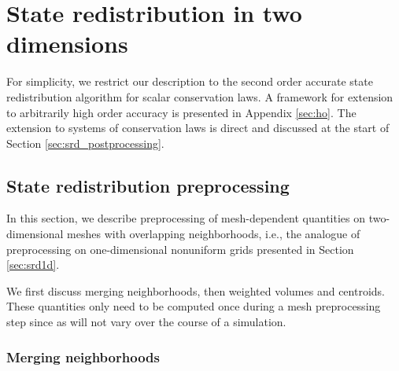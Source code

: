\section{State redistribution in two dimensions}\label{sec:srdAlg}

For simplicity, we restrict our description to the second order accurate state redistribution algorithm for scalar conservation laws.  A framework for extension to arbitrarily high order accuracy is presented in Appendix \ref{sec:ho}.  The extension to systems of conservation laws is direct and discussed at the start of Section \ref{sec:srd_postprocessing}.

\subsection{State redistribution preprocessing}\label{sec:preprocessing}


In this section, we describe preprocessing of mesh-dependent quantities on two-dimensional meshes with overlapping neighborhoods, i.e., the analogue of preprocessing on one-dimensional nonuniform grids presented in Section \ref{sec:srd1d}.

We first discuss merging neighborhoods, then weighted volumes and centroids.  These quantities only need to be computed once during a mesh preprocessing step since as will not vary over the course of a simulation.  



\subsubsection*{Merging neighborhoods}


